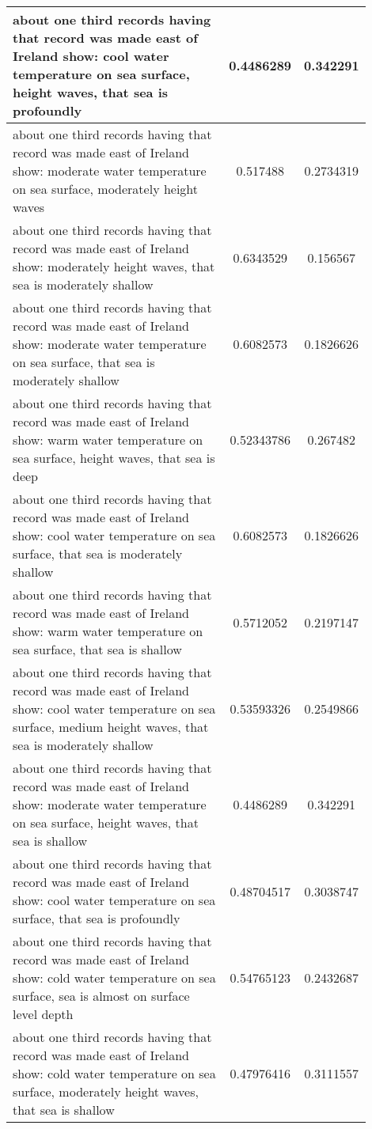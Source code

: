 \documentclass{article}
\begin{document}
\begin{longtable}{|p{0.9\linewidth}|c|c|}
about one third records having that record was made east of Ireland show: cool water temperature on sea surface, height waves, that sea is profoundly & 0.4486289 & 0.342291 \\ \hline
about one third records having that record was made east of Ireland show: moderate water temperature on sea surface, moderately height waves & 0.517488 & 0.2734319 \\ \hline
about one third records having that record was made east of Ireland show: moderately height waves, that sea is moderately shallow & 0.6343529 & 0.156567 \\ \hline
about one third records having that record was made east of Ireland show: moderate water temperature on sea surface, that sea is moderately shallow & 0.6082573 & 0.1826626 \\ \hline
about one third records having that record was made east of Ireland show: warm water temperature on sea surface, height waves, that sea is deep & 0.52343786 & 0.267482 \\ \hline
about one third records having that record was made east of Ireland show: cool water temperature on sea surface, that sea is moderately shallow & 0.6082573 & 0.1826626 \\ \hline
about one third records having that record was made east of Ireland show: warm water temperature on sea surface, that sea is shallow & 0.5712052 & 0.2197147 \\ \hline
about one third records having that record was made east of Ireland show: cool water temperature on sea surface, medium height waves, that sea is moderately shallow & 0.53593326 & 0.2549866 \\ \hline
about one third records having that record was made east of Ireland show: moderate water temperature on sea surface, height waves, that sea is shallow & 0.4486289 & 0.342291 \\ \hline
about one third records having that record was made east of Ireland show: cool water temperature on sea surface, that sea is profoundly & 0.48704517 & 0.3038747 \\ \hline
about one third records having that record was made east of Ireland show: cold water temperature on sea surface, sea is almost on surface level depth & 0.54765123 & 0.2432687 \\ \hline
about one third records having that record was made east of Ireland show: cold water temperature on sea surface, moderately height waves, that sea is shallow & 0.47976416 & 0.3111557 \\ \hline

\end{longtable}
\end{document}
